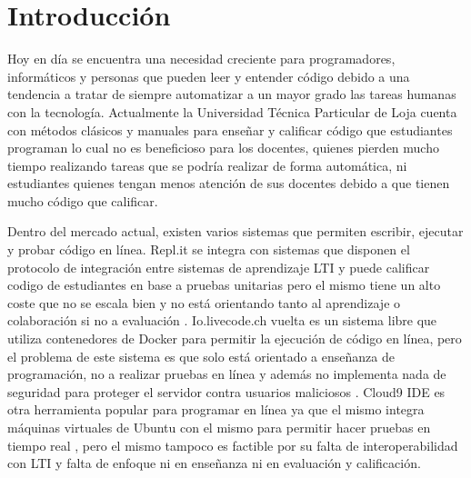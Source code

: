 
\chapter{Introducción}
\label{capitulo1}

%


\newcommand{\keyword}[1]{\textbf{#1}}
\newcommand{\tabhead}[1]{\textbf{#1}}
\newcommand{\code}[1]{\texttt{#1}}
\newcommand{\file}[1]{\texttt{\bfseries#1}}
\newcommand{\option}[1]{\texttt{\itshape#1}}


Hoy en día se encuentra una necesidad creciente para programadores, informáticos y personas que pueden leer y entender código debido a una tendencia a tratar de siempre automatizar a un mayor grado las tareas humanas con la tecnología. Actualmente la Universidad Técnica Particular de Loja cuenta con métodos clásicos y manuales para enseñar y calificar código que estudiantes programan lo cual no es beneficioso para los docentes, quienes pierden mucho tiempo realizando tareas que se podría realizar de forma automática, ni estudiantes quienes tengan menos atención de sus docentes debido a que tienen mucho código que calificar.
 
Dentro del mercado actual, existen varios sistemas que permiten escribir, ejecutar y probar código en línea. Repl.it se integra con sistemas que disponen el protocolo de integración entre sistemas de aprendizaje LTI  \citep{Repl.it-Home} y puede calificar codigo de estudiantes en base a pruebas unitarias pero el mismo tiene un alto coste que no se escala bien y no está orientando tanto al aprendizaje o colaboración si no a evaluación \citep{Lopez-Jorge}. Io.livecode.ch vuelta es un sistema libre que utiliza contenedores de Docker para permitir la ejecución de código en línea, pero el problema de este sistema es que solo está orientado a enseñanza de programación, no a realizar pruebas en línea y además no implementa nada de seguridad para proteger el servidor contra usuarios maliciosos \citep{io.livecode.ch}. Cloud9 IDE es otra herramienta popular para programar en línea ya que el mismo integra máquinas virtuales de Ubuntu con el mismo para permitir hacer pruebas en tiempo real \citep{Cloud9-Home}, pero el mismo tampoco es factible por su falta de interoperabilidad con LTI  y falta de enfoque ni en enseñanza ni en evaluación y calificación. 
 
